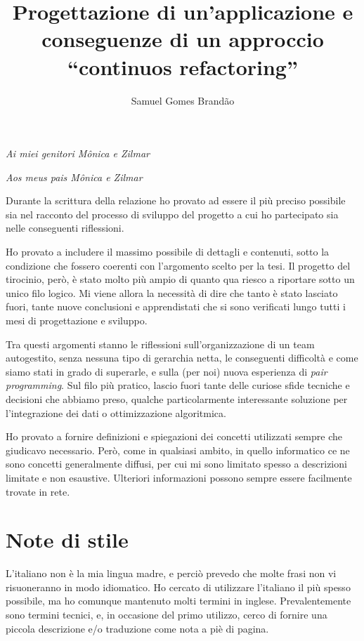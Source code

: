 \documentclass[12pt]{report}
\begin{document}
\renewcommand{\baselinestretch}{1.3}
\title{Progettazione di un'applicazione e conseguenze di un approccio
``continuos refactoring''}
\author{Samuel Gomes Brandão}

\beforepreface
{}
        {\hfill \Large {\sl Ai miei genitori Mônica e Zilmar}}

        {\hfill \Large {\sl Aos meus pais Mônica e Zilmar}}
% 
%

Durante la scrittura della relazione ho provato ad essere il più preciso 
possibile sia nel racconto del processo di sviluppo del progetto 
a cui ho partecipato sia nelle conseguenti riflessioni.

Ho provato a includere il massimo possibile di dettagli e contenuti, 
sotto la condizione che fossero coerenti con l'argomento scelto per 
la tesi. Il progetto del tirocinio, però, è stato molto più ampio di 
quanto qua riesco a riportare sotto un unico filo logico. Mi viene 
allora la necessità di dire che tanto è stato lasciato fuori, tante 
nuove conclusioni e apprendistati che si sono verificati lungo tutti 
i mesi di progettazione e sviluppo.

Tra questi argomenti stanno le riflessioni sull'organizzazione di 
un team autogestito, senza nessuna tipo di gerarchia netta, le 
conseguenti difficoltà e come siamo stati in grado di superarle, 
e sulla (per noi) nuova esperienza di \textit{pair programming}. 
Sul filo più pratico, lascio fuori tante delle curiose sfide 
tecniche e decisioni che abbiamo preso, qualche particolarmente 
interessante soluzione per l'integrazione dei dati o 
ottimizzazione algoritmica.

Ho provato a fornire definizioni e spiegazioni dei concetti utilizzati sempre
che giudicavo necessario. Però, come in qualsiasi ambito, in quello informatico 
ce ne sono concetti generalmente diffusi, per cui mi sono limitato spesso a
descrizioni limitate e non esaustive. Ulteriori informazioni possono sempre
essere facilmente trovate in rete.

\section*{Note di stile}
L'italiano non è la mia lingua madre, e perciò prevedo che molte frasi
non vi risuoneranno in modo idiomatico. Ho cercato di utilizzare l'italiano
il più spesso possibile, ma ho comunque mantenuto molti termini in inglese.
Prevalentemente sono termini tecnici, e, in occasione del primo utilizzo,
cerco di fornire una piccola descrizione e/o traduzione come nota a piè di
pagina.
\end{document}
